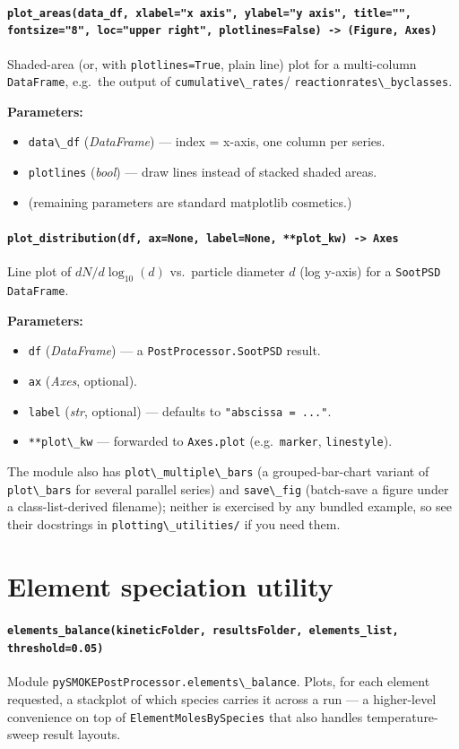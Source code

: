 \documentclass[11pt,a4paper]{report}
\newcommand{\pyfunc}[1]{\subsubsection{\texttt{#1}}}
\newenvironment{params}{\vspace{1mm}\noindent\textbf{Parameters:}\begin{itemize}[leftmargin=1.1cm,label={--},itemsep=1pt,topsep=2pt]}{\end{itemize}}
\newcommand{\pkg}[1]{\lstinline|#1|}
\begin{document}
\pyfunc{plot\_areas(data\_df, xlabel="x axis", ylabel="y axis", title="", fontsize="8", loc="upper right", plotlines=False) -> (Figure, Axes)}

Shaded-area (or, with \pkg{plotlines=True}, plain line) plot for a
multi-column \pkg{DataFrame}, e.g.\ the output of \pkg{cumulative\_rates}/
\pkg{reactionrates\_byclasses}.

\begin{params}
\item \pkg{data\_df} (\textit{DataFrame}) --- index = x-axis, one column per
  series.
\item \pkg{plotlines} (\textit{bool}) --- draw lines instead of stacked
  shaded areas.
\item (remaining parameters are standard matplotlib cosmetics.)
\end{params}

\pyfunc{plot\_distribution(df, ax=None, label=None, **plot\_kw) -> Axes}

Line plot of $dN/d\log_{10}(d)$ vs.\ particle diameter $d$ (log y-axis) for
a \pkg{SootPSD} \pkg{DataFrame}.

\begin{params}
\item \pkg{df} (\textit{DataFrame}) --- a \pkg{PostProcessor.SootPSD} result.
\item \pkg{ax} (\textit{Axes}, optional).
\item \pkg{label} (\textit{str}, optional) --- defaults to
  \pkg{"abscissa = ..."}.
\item \pkg{**plot\_kw} --- forwarded to \pkg{Axes.plot} (e.g.\
  \pkg{marker}, \pkg{linestyle}).
\end{params}

The module also has \pkg{plot\_multiple\_bars} (a grouped-bar-chart variant
of \pkg{plot\_bars} for several parallel series) and \pkg{save\_fig} (batch-save
a figure under a class-list-derived filename); neither is exercised by any
bundled example, so see their docstrings in \pkg{plotting\_utilities/} if you
need them.

\chapter{Element speciation utility}

\pyfunc{elements\_balance(kineticFolder, resultsFolder, elements\_list, threshold=0.05)}

Module \pkg{pySMOKEPostProcessor.elements\_balance}. Plots, for each element
requested, a stackplot of which species carries it across a run --- a
higher-level convenience on top of \pkg{ElementMolesBySpecies} that also
handles temperature-sweep result layouts.
\end{document}
